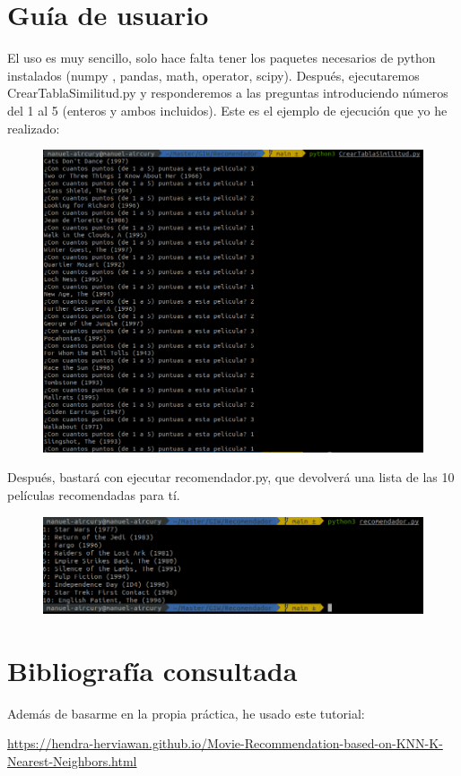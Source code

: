 \section{Guía de usuario}
El uso es muy sencillo, solo hace falta tener los paquetes necesarios de python instalados (numpy , pandas, math, operator, scipy). Después, ejecutaremos CrearTablaSimilitud.py y responderemos a las preguntas introduciendo números del 1 al 5 (enteros y ambos incluidos). Este es el ejemplo de ejecución que yo he realizado:
\begin{figure}[H]
	\centering
	\includegraphics[width=0.7\linewidth]{Imagenes/screenshot001}
\end{figure}

Después, bastará con ejecutar recomendador.py, que devolverá una lista de las 10 películas recomendadas para tí.

\begin{figure}[H]
	\centering
	\includegraphics[width=0.7\linewidth]{Imagenes/screenshot003}
\end{figure}



\section{Bibliografía consultada}
Además de basarme en la propia práctica, he usado este tutorial:

\url{https://hendra-herviawan.github.io/Movie-Recommendation-based-on-KNN-K-Nearest-Neighbors.html}

